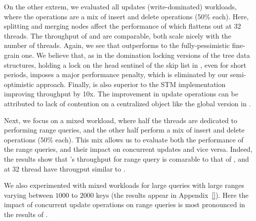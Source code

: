 On the other extrem, we evaluated all updates (write-dominated) workloads, where the operations are a mix of insert and delete operations (50\% each). Here, splitting and merging nodes affect the performance of \kary which flattens out at 32 threads. The throughput of \autoSkiplist and \stmSkiplist are comparable, both scale nicely with the number of threads.
Again, we see that \autoSkiplist outperforms
  to the fully-pessimistic fine-grain one. We believe that,
as in the
domination locking versions of the tree data structures, holding a lock on the head sentinel of the skip list in
\domSkiplist, even for short periods, imposes a major performance penalty,
which is eliminated by our semi-optimistic approach. 
Finally, \autoSkiplist is also superior to the STM implementation
improving throughput by
10x. The improvement in update operations can be attributed to lack of contention on a centralized object like the global version in \stmSkiplist.

Next, we focus on a mixed workload, where half the
threads are dedicated to performing range queries, and the other half perform a
mix of insert and delete operations (50\% each).
This mix allows us to evaluate both the performance of the range queries,
and their impact on concurrent updates and vice versa.
Indeed, the results show that \kary's throughput for range query is comarable to that of \skiplist, and at 32 thread have througput similar to \autoSkiplist.

We also experimented with mixed workloads for large queries with large ranges varying between $1000$ to $2000$ keys (the results appear in Appendix~\ref{}). Here the impact of concurrent update operations on range queries is most pronounced in the results of \kary.

